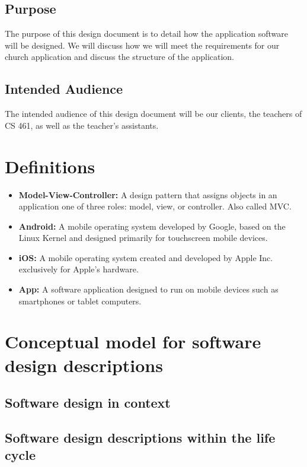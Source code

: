 \documentclass[letterpaper,10pt,draftclsnofoot,onecolumn,titlepage]{IEEEtran}
\begin{document}
		\subsection{Purpose}
			The purpose of this design document is to detail how the application software will be designed.
			We will discuss how we will meet the requirements for our church application and discuss the structure of the application.
		\subsection{Intended Audience}
			The intended audience of this design document will be our clients, the teachers of CS 461, as well as the teacher's assistants.


	\section{Definitions}
		\begin{itemize}
			\item \textbf{Model-View-Controller:} A design pattern that assigns objects in an application one of three roles: model, view, or controller. Also called MVC.
			\item \textbf{Android:} A mobile operating system developed by Google, based on the Linux Kernel and designed primarily for touchscreen mobile devices.
			\item \textbf{iOS:} A mobile operating system created and developed by Apple Inc. exclusively for Apple's hardware.
			\item \textbf{App:} A software application designed to run on mobile devices such as smartphones or tablet computers.
		\end{itemize}


	\section{Conceptual model for software design descriptions}

		\subsection{Software design in context}

		\subsection{Software design descriptions within the life cycle}
\end{document}
